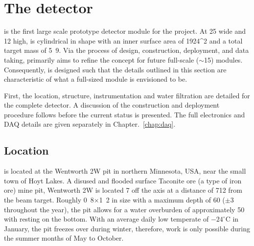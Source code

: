 \section{The \chipsfive detector} %
\label{sec:chips_detector} %

\chipsfive is the first large scale prototype detector module for the \chips project. At
\unit{25}{} wide and \unit{12}{} high, \chipsfive is cylindrical in shape with
an inner surface area of \unit{1924}{^2} and a total target mass of
\unit{5.9}{}. Via the process of design, construction, deployment, and data taking,
\chipsfive primarily aims to refine the \chips concept for future full-scale
($\sim$\unit{15}{}) modules. Consequently, \chipsfive is designed such that the
details outlined in this section are characteristic of what a full-sized \chips module is
envisioned to be.

First, the location, structure, instrumentation and water filtration are detailed for the complete
detector. A discussion of the construction and deployment procedure follows before the current
status is presented. The full electronics and DAQ details are given separately in
Chapter.~\ref{chap:daq}.

\subsection{Location} %
\label{sec:chips_detector_location} %

\chipsfive is located at the Wentworth 2W pit in northern Minnesota, USA, near the small town of
Hoyt Lakes. A disused and flooded surface Taconite ore (a type of iron ore) mine pit, Wentworth 2W
is located \unit{7}{} off the \numi axis at a distance of \unit{712}{}
from the beam target. Roughly \unit{0.8}{}$\times$\unit{1.2}{} in size with
a maximum depth of \unit{60}{} ($\pm$\unit{3}{} throughout the year), the pit
allows for a water overburden of approximately \unit{50}{} with \chipsfive resting on
the bottom. With an average daily low temperate of $-24^{\circ}\text{C}$ in January, the pit
freezes over during winter, therefore, work is only possible during the summer months of May to
October.

